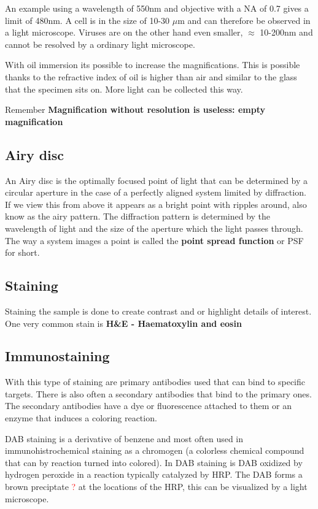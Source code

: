 	An example using a wavelength of 550nm and objective with a NA of 0.7 gives a limit of 480nm. A cell is in the size of 10-30 $\mu$m and can therefore be observed in a light microscope. Viruses are on the other hand even smaller, $\approx$ 10-200nm and cannot be resolved by a ordinary light microscope. 

	With oil immersion its possible to increase the magnifications. This is possible thanks to the refractive index of oil is higher than air and similar to the glass that the specimen sits on. More light can be collected this way. 

	\begin{wbox}{Remember}
		  \textbf{Magnification without resolution is useless: empty magnification}
	\end{wbox}
	
	\subsection*{Airy disc}
	An Airy disc is the optimally focused point of light that can be determined by a circular aperture in the case of a perfectly aligned system limited by diffraction. If we view this from above it appears as a bright point with ripples around, also know as the airy pattern. The diffraction pattern is determined by the wavelength of light and the size of the aperture which the light passes through. The way a system images a point is called the \textbf{point spread function} or PSF for short. 

	\subsection*{Staining}
	Staining the sample is done to create contrast and or highlight details of interest. One very common stain is \textbf{H\&E - Haematoxylin and eosin} 

	\subsection*{Immunostaining}
	With this type of staining are primary antibodies used that can bind to specific targets. There is also often a secondary antibodies that bind to the primary ones. The secondary antibodies have a dye or fluorescence attached to them or an enzyme that induces a coloring reaction. 

	DAB staining is a derivative of benzene and most often used in immunohistrochemical staining as a chromogen (a colorless chemical compound that can by reaction turned into colored). In DAB staining is DAB oxidized by hydrogen peroxide in a reaction typically catalyzed by HRP. The DAB forms a brown preciptate \textcolor{red}{?} at the locations of the HRP, this can be visualized by a light microscope. 

